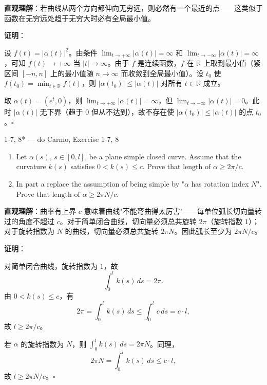 \begin{solution}
\textbf{直观理解}：若曲线从两个方向都伸向无穷远，则必然有一个最近的点——这类似于函数在无穷远处趋于无穷大时必有全局最小值。

\textbf{证明}：
\item[a.] 设 $f(t) = |\alpha(t)|^2$。由条件 $\lim_{t\to+\infty}|\alpha(t)| = \infty$ 和 $\lim_{t\to-\infty}|\alpha(t)| = \infty$，可知 $f(t) \to +\infty$ 当 $|t|\to\infty$。由于 $f$ 是连续函数，$f$ 在 $\mathbb{R}$ 上取到最小值（紧区间 $[-n,n]$ 上的最小值随 $n\to\infty$ 而收敛到全局最小值）。设 $t_0$ 使 $f(t_0) = \min_{t\in\mathbb{R}} f(t)$，则 $|\alpha(t_0)| \leq |\alpha(t)|$ 对所有 $t\in\mathbb{R}$ 成立。

\item[b.] 取 $\alpha(t) = (e^t, 0)$，则 $\lim_{t\to+\infty}|\alpha(t)| = \infty$，但 $\lim_{t\to-\infty}|\alpha(t)| = 0$。此时 $|\alpha(t)|$ 无下界（趋于 $0$ 但从不达到），故不存在使 $|\alpha(t_0)| \leq |\alpha(t)|$ 的点 $t_0$。$\square$
\end{solution}

\begin{exercise}{1-7, 8* — do Carmo, Exercise 1-7, 8}
\begin{enumerate}
\item[a.] Let $\alpha(s)$, $s \in [0, l]$, be a plane simple closed curve. Assume that the curvature $k(s)$ satisfies $0 < k(s) \leq c$. Prove that $\text{length of } \alpha \geq 2\pi/c$.
\item[b.] In part a replace the assumption of being simple by "$\alpha$ has rotation index $N$". Prove that $\text{length of } \alpha \geq 2\pi N/c$.
\end{enumerate}
\end{exercise}

\begin{solution}
\textbf{直观理解}：曲率有上界 $c$ 意味着曲线"不能弯曲得太厉害"——每单位弧长切向量转过的角度不超过 $c$。对于简单闭合曲线，切向量必须总共旋转 $2\pi$（旋转指数 $1$）；对于旋转指数为 $N$ 的曲线，切向量必须总共旋转 $2\pi N$。因此弧长至少为 $2\pi N / c$。

\textbf{证明}：
\item[a.] 对简单闭合曲线，旋转指数为 $1$，故
\[
\int_0^l k(s) \, ds = 2\pi.
\]
由 $0 < k(s) \leq c$，有
\[
2\pi = \int_0^l k(s) \, ds \leq \int_0^l c \, ds = c \cdot l,
\]
故 $l \geq 2\pi / c$。

\item[b.] 若 $\alpha$ 的旋转指数为 $N$，则 $\int_0^l k(s) \, ds = 2\pi N$。同理，
\[
2\pi N = \int_0^l k(s) \, ds \leq c \cdot l,
\]
故 $l \geq 2\pi N / c$。$\square$
\end{solution}

